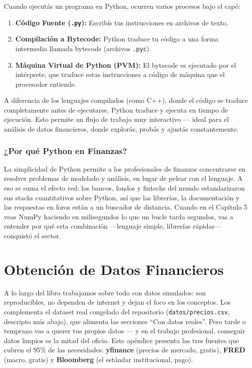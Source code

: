 \documentclass[
  spanish,
  letterpaper,
  DIV=11,
  numbers=noendperiod]{scrreprt}
\providecommand{\tightlist}{%
  \setlength{\itemsep}{0pt}\setlength{\parskip}{0pt}}
\begin{document}
Cuando ejecutás un programa en Python, ocurren varios procesos bajo el
capó:

\begin{enumerate}
\def\labelenumi{\arabic{enumi}.}
\tightlist
\item
  \textbf{Código Fuente (\texttt{.py}):} Escribís tus instrucciones en
  archivos de texto.
\item
  \textbf{Compilación a Bytecode:} Python traduce tu código a una forma
  intermedia llamada bytecode (archivos \texttt{.pyc}).
\item
  \textbf{Máquina Virtual de Python (PVM):} El bytecode es ejecutado por
  el intérprete, que traduce estas instrucciones a código de máquina que
  el procesador entiende.
\end{enumerate}

A diferencia de los lenguajes compilados (como C++), donde el código se
traduce completamente antes de ejecutarse, Python traduce y ejecuta en
tiempo de ejecución. Esto permite un flujo de trabajo muy interactivo
--- ideal para el análisis de datos financieros, donde explorás, probás
y ajustás constantemente.

\subsection{¿Por qué Python en
Finanzas?}\label{por-quuxe9-python-en-finanzas}

La simplicidad de Python permite a los profesionales de finanzas
concentrarse en resolver problemas de modelado y análisis, en lugar de
pelear con el lenguaje. A eso se suma el efecto red: los bancos, fondos
y fintechs del mundo estandarizaron sus stacks cuantitativos sobre
Python, así que las librerías, la documentación y las respuestas en
foros están a un buscador de distancia. Cuando en el Capítulo 5 veas
NumPy haciendo en milisegundos lo que un bucle tarda segundos, vas a
entender por qué esta combinación ---lenguaje simple, librerías
rápidas--- conquistó el sector.

\chapter{Obtención de Datos Financieros}\label{sec-datos-financieros}

A lo largo del libro trabajamos sobre todo con datos simulados: son
reproducibles, no dependen de internet y dejan el foco en los conceptos.
Los complementa el dataset real congelado del repositorio
(\texttt{datos/precios.csv}, descripto más abajo), que alimenta las
secciones ``Con datos reales''. Pero tarde o temprano vas a querer tus
propios datos --- y en el trabajo profesional, conseguir datos limpios
es la mitad del oficio. Este apéndice presenta las tres fuentes que
cubren el 95\% de las necesidades: \textbf{yfinance} (precios de
mercado, gratis), \textbf{FRED} (macro, gratis) y \textbf{Bloomberg} (el
estándar institucional, pago).
\end{document}
